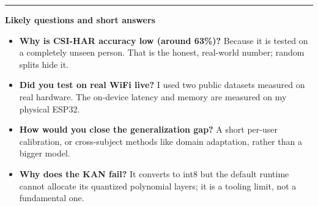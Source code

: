 \documentclass[11pt]{article}
\begin{document}
\vspace{10pt}
\hrule
\vspace{6pt}
{\small\bfseries\color{teal} Likely questions and short answers}
\begin{itemize}[leftmargin=1.4em,itemsep=2pt]
  \item \textbf{Why is CSI-HAR accuracy low (around 63\%)?} Because it is tested on a completely unseen person. That is the honest, real-world number; random splits hide it.
  \item \textbf{Did you test on real WiFi live?} I used two public datasets measured on real hardware. The on-device latency and memory are measured on my physical ESP32.
  \item \textbf{How would you close the generalization gap?} A short per-user calibration, or cross-subject methods like domain adaptation, rather than a bigger model.
  \item \textbf{Why does the KAN fail?} It converts to int8 but the default runtime cannot allocate its quantized polynomial layers; it is a tooling limit, not a fundamental one.
\end{itemize}
\end{document}
